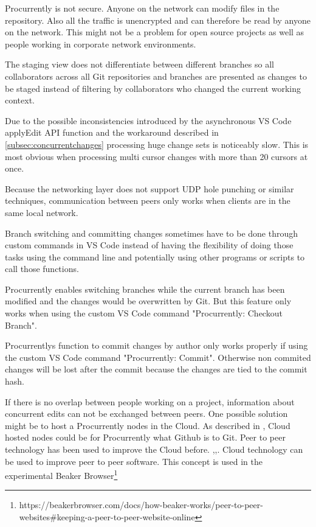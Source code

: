Procurrently is not secure. Anyone on the network can modify files in the repository. Also all the traffic is unencrypted and can therefore be read by anyone on the network. This might not be a problem for open source projects as well as people working in corporate network environments.

The staging view does not differentiate between different branches so all collaborators across all Git repositories and branches are presented as changes to be staged instead of filtering by collaborators who changed the current working context.

Due to the possible inconsistencies introduced by the asynchronous VS Code applyEdit API function and the workaround described in \autoref{subsec:concurrentchanges} processing huge change sets is noticeably slow. This is most obvious when processing multi cursor changes with more than 20 cursors at once.

Because the networking layer does not support UDP hole punching\cite{10.1007/978-3-642-20798-3_1} or similar techniques, communication between peers only works when clients are in the same local network.

Branch switching and committing changes sometimes have to be done through custom commands in VS Code instead of having the flexibility of doing those tasks using the command line and potentially using other programs or scripts to call those functions.

Procurrently enables switching branches while the current branch has been modified and the changes would be overwritten by Git. But this feature only works when using the custom VS Code command "Procurrently: Checkout Branch".

Procurrentlys function to commit changes by author only works properly if using the custom VS Code command "Procurrently: Commit". Otherwise non commited changes will be lost after the commit because the changes are tied to the commit hash.

If there is no overlap between people working on a project, information about concurrent edits can not be exchanged between peers.
One possible solution might be to host a Procurrently nodes in the Cloud. As described in \cite{6188603}, Cloud hosted nodes could be for Procurrently what Github is to Git. 
Peer to peer technology has been used to improve the Cloud before. \cite{Ranjan2013},\cite{Ranjan2010},\cite{Babaoglu:2012:DIP:2245276.2245357}. Cloud technology can be used to improve peer to peer software. This concept is used in the experimental Beaker Browser\footnote{https://beakerbrowser.com/docs/how-beaker-works/peer-to-peer-websites\#keeping-a-peer-to-peer-website-online}
